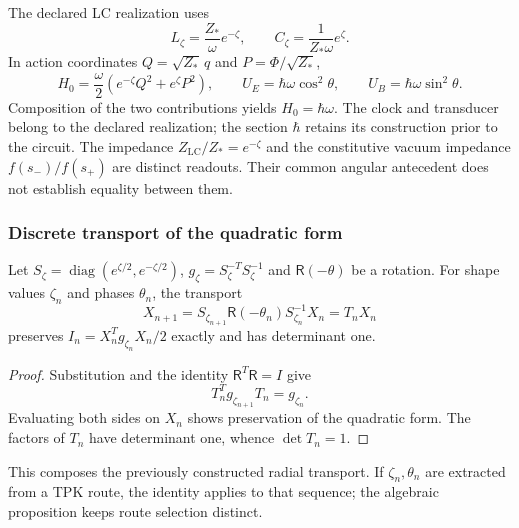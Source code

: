 The declared LC realization uses
\begin{equation}
 L_\zeta=\frac{Z_*}{\omega}e^{-\zeta},\qquad
 C_\zeta=\frac{1}{Z_*\omega}e^\zeta.
 \label{md:hib:lc}
\end{equation}
In action coordinates $Q=\sqrt{Z_*}\,q$ and
$P=\Phi/\sqrt{Z_*}$,
\begin{equation}
 H_0=\frac{\omega}{2}
 \left(e^{-\zeta}Q^2+e^\zeta P^2\right),\qquad
 U_E=\hbar\omega\cos^2\theta,\qquad
 U_B=\hbar\omega\sin^2\theta.
 \label{md:hib:energia-elipse}
\end{equation}
Composition of the two contributions yields $H_0=\hbar\omega$.
The clock and transducer belong to the declared realization; the section
$\hbar$ retains its construction prior to the circuit. The impedance
$Z_{\mathrm{LC}}/Z_*=e^{-\zeta}$ and the constitutive vacuum impedance
$f(s_-)/f(s_+)$ are distinct readouts. Their common angular antecedent does
not establish equality between them.

\subsubsection{Discrete transport of the quadratic form}
\label{md:hib:transporte-discreto}

\begin{proposition}
\label{md:hib:proposicion-discreta}
Let $S_\zeta=\operatorname{diag}(e^{\zeta/2},e^{-\zeta/2})$,
$g_\zeta=S_\zeta^{-T}S_\zeta^{-1}$ and
$\mathsf R(-\theta)$ be a rotation. For shape values $\zeta_n$ and
phases $\theta_n$, the transport
\begin{equation}
 X_{n+1}=S_{\zeta_{n+1}}\mathsf R(-\theta_n)S_{\zeta_n}^{-1}X_n
 =T_nX_n
 \label{md:hib:transporte}
\end{equation}
preserves $I_n=X_n^Tg_{\zeta_n}X_n/2$ exactly and has determinant one.
\end{proposition}
\begin{proof}
Substitution and the identity $\mathsf R^T\mathsf R=I$ give
\begin{equation}
 T_n^Tg_{\zeta_{n+1}}T_n=g_{\zeta_n}.
 \label{md:hib:isometria-transportada}
\end{equation}
Evaluating both sides on $X_n$ shows preservation of the quadratic form.
The factors of $T_n$ have determinant one, whence $\det T_n=1$.
\end{proof}
This composes the previously constructed radial transport. If
$\zeta_n,\theta_n$ are extracted from a TPK route, the identity applies to
that sequence; the algebraic proposition keeps route selection distinct.

